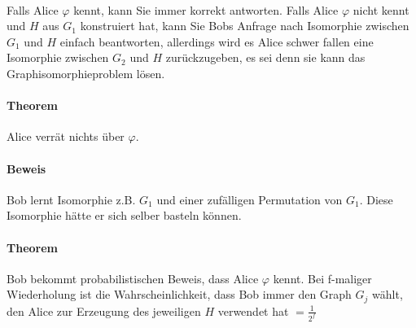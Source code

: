 
\paragraph*{} Falls Alice $\varphi$ kennt, kann Sie immer korrekt antworten. Falls Alice $\varphi$ nicht kennt und $H$ aus $G_1$ konstruiert hat, kann Sie Bobs Anfrage nach Isomorphie zwischen $G_1$ und $H$ einfach beantworten, allerdings wird es Alice schwer fallen eine Isomorphie zwischen $G_2$ und $H$ zurückzugeben, es sei denn sie kann das Graphisomorphieproblem lösen.

\paragraph*{Theorem} Alice verrät nichts über $\varphi$.

\paragraph*{Beweis} Bob lernt Isomorphie z.B. $G_1$ und einer zufälligen Permutation von $G_1$. Diese Isomorphie hätte er sich selber basteln können.

\paragraph*{Theorem} Bob bekommt probabilistischen Beweis, dass Alice $\varphi$ kennt. Bei f-maliger Wiederholung ist die Wahrscheinlichkeit, dass Bob immer den Graph $G_j$ wählt, den Alice zur Erzeugung des jeweiligen $H$ verwendet hat $= \frac{1}{2^f}$